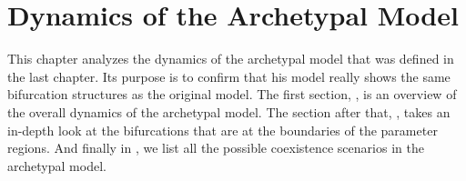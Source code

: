 \chapter{Dynamics of the Archetypal Model}
\label{chap:dynarch}

This chapter analyzes the dynamics of the archetypal model that was defined in the last chapter.
Its purpose is to confirm that his model really shows the same bifurcation structures as the original model.
The first section, , is an overview of the overall dynamics of the archetypal model.
The section after that, , takes an in-depth look at the bifurcations that are at the boundaries of the parameter regions.
And finally in , we list all the possible coexistence scenarios in the archetypal model.







